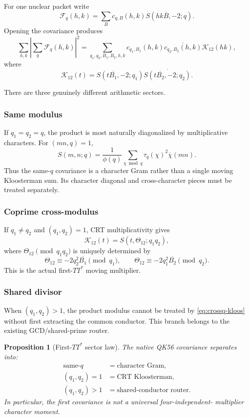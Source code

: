 \documentclass[11pt]{article}
\newtheorem{proposition}[proposition]{Proposition}
\theoremstyle{definition}
\newcommand{\1}{\mathbf 1}
\begin{document}
For one nuclear packet write
\[
 \mathcal F_q(h,k)
 =
 \sum_B c_{q,B}(h,k)S(hk\overline B,-2;q).
\]
Opening the covariance produces
\[
 \sum_{h,k}\left|\sum_q\mathcal F_q(h,k)\right|^2
 =
 \sum_{q_1,q_2,B_1,B_2,h,k}
 c_{q_1,B_1}(h,k)\overline{c_{q_2,B_2}(h,k)}
 \mathcal K_{12}(hk),
\]
where
\[
 \mathcal K_{12}(t)
 =
 S(t\overline{B_1},-2;q_1)
 \overline{S(t\overline{B_2},-2;q_2)}.
\]

There are three genuinely different arithmetic sectors.

\subsubsection{Same modulus}

If $q_1=q_2=q$, the product is most naturally diagonalized by
multiplicative characters.  For $(mn,q)=1$,
\begin{equation}
 S(m,n;q)
 =
 \frac1{\phi(q)}
 \sum_{\chi\bmod q}
   \tau_q(\chi)^2\overline{\chi}(mn).
 \label{eq:kloos-char}
\end{equation}
Thus the same-$q$ covariance is a character Gram rather than a single
moving Kloosterman sum.  Its character diagonal and cross-character pieces
must be treated separately.

\subsubsection{Coprime cross-modulus}

If $q_1\ne q_2$ and $(q_1,q_2)=1$, CRT multiplicativity gives
\begin{equation}
 \boxed{\mathcal K_{12}(t)=S(t,\Theta_{12};q_1q_2),}
 \label{eq:crossq-kloos}
\end{equation}
where $\Theta_{12}\pmod{q_1q_2}$ is uniquely determined by
\[
 \Theta_{12}\equiv-2q_2^2\overline{B_1}\pmod{q_1},
 \qquad
 \Theta_{12}\equiv-2q_1^2\overline{B_2}\pmod{q_2}.
\]
This is the actual first-$TT^\ast$ moving multiplier.

\subsubsection{Shared divisor}

When $(q_1,q_2)>1$, the product modulus cannot be treated by
\cref{eq:crossq-kloos} without first extracting the common conductor.
This branch belongs to the existing GCD/shared-prime router.

\begin{proposition}[First-$TT^\ast$ sector law]
The native QK56 covariance separates into:
\[
\begin{aligned}
  \text{same-}q&=\text{character Gram},\\
  (q_1,q_2)=1&=\text{CRT Kloosterman},\\
  (q_1,q_2)>1&=\text{shared-conductor router}.
\end{aligned}
\]
In particular, the first covariance is not a universal four-independent-
multiplier character moment.
\end{proposition}
\end{document}
